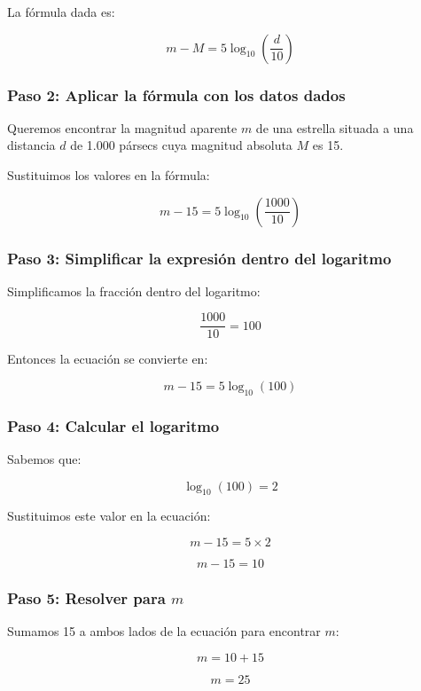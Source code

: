 \documentclass[
]{article}
\begin{document}
La fórmula dada es:

\[ m - M = 5 \log_{10} \left( \frac{d}{10} \right) \]

\subsubsection{Paso 2: Aplicar la fórmula con los datos
dados}\label{paso-2-aplicar-la-fuxf3rmula-con-los-datos-dados}

Queremos encontrar la magnitud aparente \(m\) de una estrella situada a
una distancia \(d\) de 1.000 pársecs cuya magnitud absoluta \(M\) es 15.

Sustituimos los valores en la fórmula:

\[ m - 15 = 5 \log_{10} \left( \frac{1000}{10} \right) \]

\subsubsection{Paso 3: Simplificar la expresión dentro del
logaritmo}\label{paso-3-simplificar-la-expresiuxf3n-dentro-del-logaritmo}

Simplificamos la fracción dentro del logaritmo:

\[ \frac{1000}{10} = 100 \]

Entonces la ecuación se convierte en:

\[ m - 15 = 5 \log_{10} (100) \]

\subsubsection{Paso 4: Calcular el
logaritmo}\label{paso-4-calcular-el-logaritmo}

Sabemos que:

\[ \log_{10} (100) = 2 \]

Sustituimos este valor en la ecuación:

\[ m - 15 = 5 \times 2 \]

\[ m - 15 = 10 \]

\subsubsection{\texorpdfstring{Paso 5: Resolver para
\(m\)}{Paso 5: Resolver para m}}\label{paso-5-resolver-para-m}

Sumamos 15 a ambos lados de la ecuación para encontrar \(m\):

\[ m = 10 + 15 \]

\[ m = 25 \]
\end{document}
